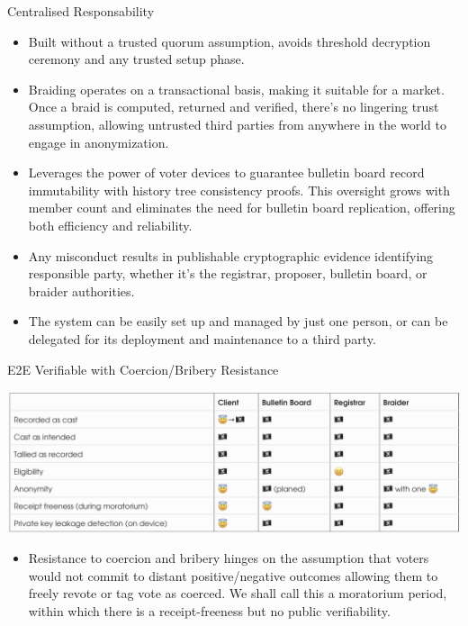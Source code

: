 \documentclass[final]{beamer}
\newlength{\colwidth}
\begin{document}
\begin{frame}[t]
\begin{columns}[t]
\begin{column}{\colwidth}
\begin{block}{Centralised Responsability}
    \begin{itemize}
    \item Built without a trusted quorum assumption, avoids threshold decryption ceremony and any trusted setup phase. 
    \item Braiding operates on a transactional basis, making it suitable for a market. Once a braid is computed, returned and verified, there’s no lingering trust assumption, allowing untrusted third parties from anywhere in the world to engage in anonymization.
    \item Leverages the power of voter devices to guarantee bulletin board record immutability with history tree consistency proofs. This oversight grows with member count and eliminates the need for bulletin board replication, offering both efficiency and reliability.
    \item Any misconduct results in publishable cryptographic evidence identifying responsible party, whether it’s the registrar, proposer, bulletin board, or braider authorities.
    \item The system can be easily set up and managed by just one person, or can be delegated for its deployment and maintenance to a third party.
    \end{itemize}
    
  \end{block}
  
  \begin{block}{E2E Verifiable with Coercion/Bribery Resistance}

    \begin{center}
      \vspace{-0.75cm}
      \includegraphics[width=\colwidth]{figures/e2e-properties.png}
      \vspace{-2.5cm}
    \end{center}

    \begin{itemize}
    \item Resistance to coercion and bribery hinges on the assumption that voters would not commit to distant positive/negative outcomes allowing them to freely revote or tag vote as coerced. We shall call this a moratorium period, within which there is a receipt-freeness but no public verifiability.
    \end{itemize}
    

\end{block}
\end{column}
\end{columns}
\end{frame}
\end{document}
